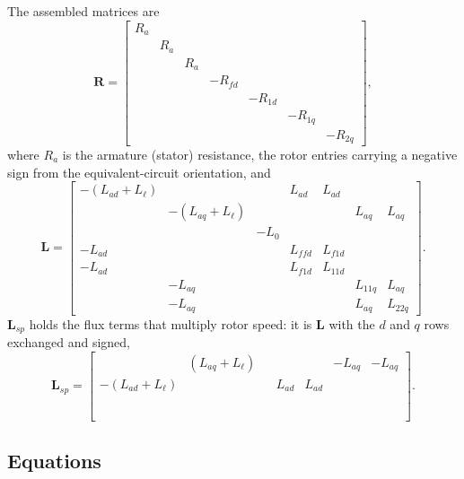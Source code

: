 \documentclass[11pt]{article}
\begin{document}
The assembled matrices are
\begin{equation}
  \bm{R} =
  \begin{bmatrix}
    R_a & & & & & & \\
     & R_a & & & & & \\
     & & R_a & & & & \\
     & & & -R_{fd} & & & \\
     & & & & -R_{1d} & & \\
     & & & & & -R_{1q} & \\
     & & & & & & -R_{2q}
  \end{bmatrix},
\end{equation}
where $R_a$ is the armature (stator) resistance, the rotor entries carrying
a negative sign from the equivalent-circuit orientation, and
\begin{equation}
  \bm{L} =
  \begin{bmatrix}
    -(L_{ad}{+}L_\ell) & & & L_{ad} & L_{ad} & & \\
     & -(L_{aq}{+}L_\ell) & & & & L_{aq} & L_{aq}\\
     & & -L_0 & & & &\\
    -L_{ad} & & & L_{ffd} & L_{f1d} & &\\
    -L_{ad} & & & L_{f1d} & L_{11d} & &\\
     & -L_{aq} & & & & L_{11q} & L_{aq}\\
     & -L_{aq} & & & & L_{aq} & L_{22q}
  \end{bmatrix}.
\end{equation}
$\bm{L}_{sp}$ holds the flux terms that multiply rotor speed: it is
$\bm{L}$ with the $d$ and $q$ rows exchanged and signed,
\begin{equation}
  \bm{L}_{sp} =
  \begin{bmatrix}
     & (L_{aq}{+}L_\ell) & & & & -L_{aq} & -L_{aq}\\
    -(L_{ad}{+}L_\ell) & & & L_{ad} & L_{ad} & & \\
     & & & & & & \\
     & & & & & & \\
     & & & & & & \\
     & & & & & & \\
     & & & & & &
  \end{bmatrix}.
\end{equation}

\subsection{Equations}
\end{document}
